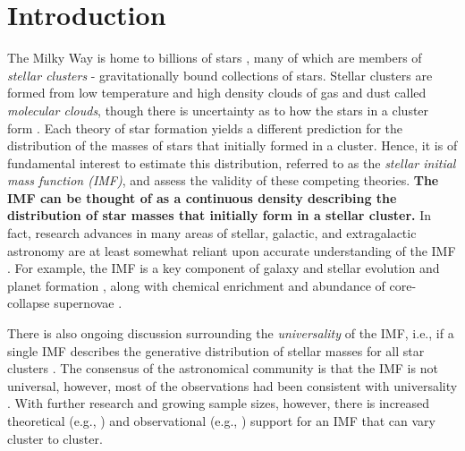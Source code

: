 \documentclass[ejs]{imsart}
\numberwithin{equation}{section}
\theoremstyle{plain}
\newcommand{\new}[1]{{\bf #1}}
\begin{document}
\section{Introduction}
\label{introSec}
The Milky Way is home to billions of stars \citep{McMillan:2016uq}, many of which 
are members of \emph{stellar clusters} - gravitationally bound collections of stars. 
Stellar clusters are formed from low temperature and high density clouds of gas and dust 
called \emph{molecular clouds}, though there 
is uncertainty as to how the stars in a cluster form \citep{Beccari2017}. 
Each theory of star formation yields a different prediction for the distribution
of the masses of stars that initially formed in a cluster. Hence, it is of fundamental 
interest to estimate this distribution, referred to as the \emph{stellar initial mass function (IMF)},
and assess the validity of these competing theories.
\new{The IMF can be thought of as a continuous density describing the distribution of star masses that initially form in a stellar cluster.}
In fact, research advances in many areas of stellar, galactic, and extragalactic astronomy are at 
least somewhat reliant upon accurate understanding of the IMF \citep{bastian2010}.
For example, the IMF is a key
component of galaxy and stellar evolution and planet formation \citep{bally2005, bastian2010, Shetty2014}, 
along with chemical enrichment and abundance of core-collapse supernovae \citep{weisz13}.

There is also ongoing discussion surrounding the {\it universality} of the IMF, i.e.,
if a single IMF describes the generative distribution of stellar masses for all
star clusters \citep{bastian2010}. The consensus of the astronomical community is that the IMF is not universal, however, most of the observations had been consistent with universality \citep{kroupa2001, bastian2010, Ashworth2017}.
With further research and growing sample sizes, however, there is increased theoretical 
(e.g., \citealt{bonnell2006, Dib2010})
and observational
(e.g., \citealt{Treu2010, Dokkum:2010fk, Spiniello2014,Geha2013, Dib2017})
support for an IMF that can vary cluster to cluster. %
\end{document}
